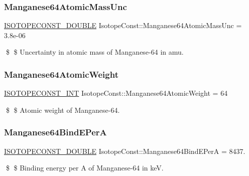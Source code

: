 \subsubsection{\texorpdfstring{Manganese64\+Atomic\+Mass\+Unc}{Manganese64AtomicMassUnc}}
{\footnotesize\ttfamily \mbox{\hyperlink{group___isotope_const-_macros_ga8f45a7272ce02c0b4c65c44636ed719a}{I\+S\+O\+T\+O\+P\+E\+C\+O\+N\+S\+T\+\_\+\+D\+O\+U\+B\+LE}} Isotope\+Const\+::\+Manganese64\+Atomic\+Mass\+Unc = 3.\+8e-\/06}

\$ \$ Uncertainty in atomic mass of Manganese-\/64 in amu. \mbox{\label{group___isotope_const-_manganese-_mn64_gae5c5cab6cc78b5db87fa18a9269221c3}} 
\subsubsection{\texorpdfstring{Manganese64\+Atomic\+Weight}{Manganese64AtomicWeight}}
{\footnotesize\ttfamily \mbox{\hyperlink{group___isotope_const-_macros_ga5f18360b3e99483a35c32d789e62621c}{I\+S\+O\+T\+O\+P\+E\+C\+O\+N\+S\+T\+\_\+\+I\+NT}} Isotope\+Const\+::\+Manganese64\+Atomic\+Weight = 64}

\$ \$ Atomic weight of Manganese-\/64. \mbox{\label{group___isotope_const-_manganese-_mn64_ga8246b1058387895472a72faafee81989}} 
\subsubsection{\texorpdfstring{Manganese64\+Bind\+E\+PerA}{Manganese64BindEPerA}}
{\footnotesize\ttfamily \mbox{\hyperlink{group___isotope_const-_macros_ga8f45a7272ce02c0b4c65c44636ed719a}{I\+S\+O\+T\+O\+P\+E\+C\+O\+N\+S\+T\+\_\+\+D\+O\+U\+B\+LE}} Isotope\+Const\+::\+Manganese64\+Bind\+E\+PerA = 8437.}

\$ \$ Binding energy per A of Manganese-\/64 in keV. \mbox{\label{group___isotope_const-_manganese-_mn64_gabd50ba6e783c2aba15d948e136b77d98}} 
